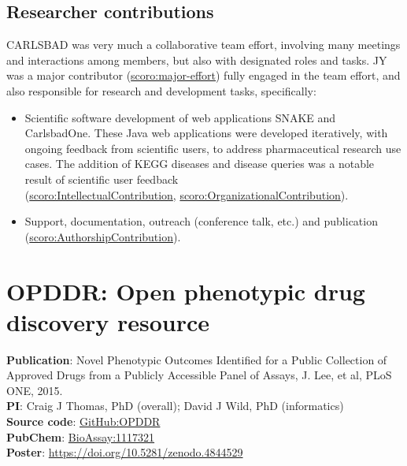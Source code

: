 \subsection{Researcher contributions}

CARLSBAD was very much a collaborative team effort, involving many meetings and interactions among members, but also with designated roles and tasks. JY was a major contributor (\href{http://purl.org/spar/scoro/major-effort}{scoro:major-effort}) fully engaged in the team effort, and also responsible for research and development tasks, specifically:

\begin{itemize}[topsep=0pt,itemsep=0pt,partopsep=0pt,parsep=0pt]
    \item Scientific software development of web applications SNAKE and CarlsbadOne. These Java web applications were developed iteratively, with ongoing feedback from scientific users, to address pharmaceutical research use cases. The addition of KEGG diseases and disease queries was a notable result of scientific user feedback\\ (\href{http://purl.org/spar/scoro/IntellectualContribution}{scoro:IntellectualContribution}, \href{http://purl.org/spar/scoro/OrganizationalContribution}{scoro:OrganizationalContribution}).
    \item Support, documentation, outreach (conference talk, etc.) and publication\\
    (\href{http://purl.org/spar/scoro/AuthorshipContribution}{scoro:AuthorshipContribution}). 
\end{itemize}

\newpage

\section{OPDDR: Open phenotypic drug discovery resource}
\label{section:opddr}

\textbf{Publication}: Novel Phenotypic Outcomes Identified for a Public Collection of Approved Drugs from a Publicly Accessible Panel of Assays, J. Lee, et al, PLoS ONE, 2015\cite{Lee2015-vg}.\\
\textbf{PI}: Craig J Thomas, PhD (overall); David J Wild, PhD (informatics)\\
\textbf{Source code}: \href{https://github.com/IUIDSL/OPDDR}{GitHub:OPDDR}\\
\textbf{PubChem}: \href{https://pubchem.ncbi.nlm.nih.gov/bioassay/1117321}{BioAssay:1117321}\\
\textbf{Poster}: \href{https://doi.org/10.5281/zenodo.4844529}{https://doi.org/10.5281/zenodo.4844529}

